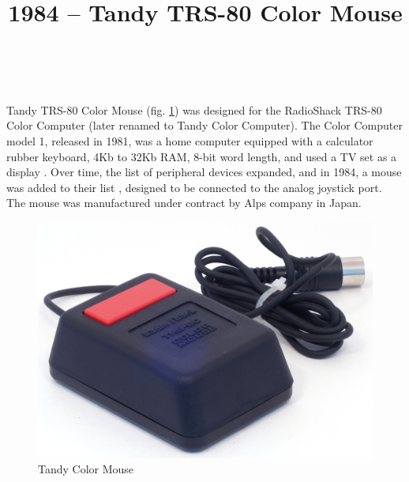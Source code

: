 \documentclass[11pt, a4paper]{article}
\begin{document}
\title{1984 -- Tandy TRS-80 Color Mouse}
\date{}
\author{~}
\maketitle
{}

Tandy TRS-80 Color Mouse (fig. \ref{fig:TandyColorMousePic}) was designed for the RadioShack TRS-80 Color Computer (later renamed to Tandy Color Computer). The Color Computer model 1, released in 1981, was a home computer equipped with a calculator rubber keyboard, 4Kb to 32Kb RAM, 8-bit word length, and used a TV set as a display \cite{wiki}. Over time, the list of peripheral devices expanded, and in 1984, a mouse  was added to their list \cite{adv}, designed to be connected to the analog joystick port. The mouse was manufactured under contract by Alps company in Japan.

\begin{figure}[h]
   \centering
    \includegraphics[scale=0.66]{1984_tandy_trs80_color_mouse/pic_30.jpg}
    \caption{Tandy Color Mouse}
    \label{fig:TandyColorMousePic}
\end{figure}
\end{document}

